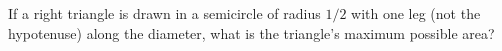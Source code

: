 If a right triangle is drawn in a semicircle of radius $1/2$ with one leg (not the hypotenuse) along the diameter, what is the triangle's maximum possible area?